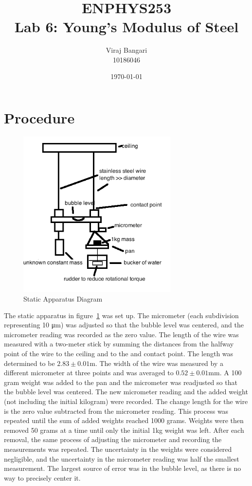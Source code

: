 \documentclass[]{article}
\title{ENPHYS253 \\ Lab 6: Young's Modulus of Steel}
\author{Viraj Bangari \\ 10186046}
\date{\today}
\newcommand{\staticWireDiameter}{\ensuremath{0.52 \pm 0.01 \si{\milli\meter}}}
\newcommand{\staticWireLength}{\ensuremath{2.83 \pm 0.01 \si{\meter}}}
\begin{document}
 
\maketitle

\section{Procedure}
\begin{figure}[H]
    \center
    \includegraphics[width=8cm]{../output/diagram1.png}
    \caption{Static Apparatus Diagram}\label{fig:staticapparatus}
\end{figure}
The static apparatus in figure~\ref{fig:staticapparatus} was set up. The
micrometer (each subdivision representing 10 \si{\micro\meter}) was adjusted so
that the bubble level was centered, and the micrometer reading was recorded as
the zero value.  The length of the wire was measured with a two-meter stick by
summing the distances from the halfway point of the wire to the ceiling and to
the and contact point. The length was determined to be \staticWireLength. The
width of the wire was measured by a different micrometer at three points and was
averaged to \staticWireDiameter. A 100 gram weight was added to the pan and the
micrometer was readjusted so that the bubble level was centered. The new
micrometer reading and the added weight (not including the initial kilogram)
were recorded. The change length for the wire is the zero value subtracted from
the micrometer reading.  This process was repeated until the sum of added
weights reached 1000 grams.  Weights were then removed 50 grams at a time until
only the initial 1kg weight was left.  After each removal, the same process of
adjusting the micrometer and recording the measurements was repeated.  The
uncertainty in the weights were considered negligible, and the uncertainty in
the micrometer reading was half the smallest measurement. The largest source of
error was in the bubble level, as there is no way to precisely center it.
\end{document}
